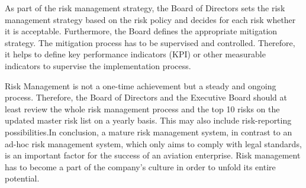 \documentclass[a4paper, 10pt]{article}
\begin{document}
As part of the risk management strategy, the Board of Directors sets the risk management
strategy based on the risk policy and decides for each risk whether it is acceptable. Furthermore,
the Board defines the appropriate mitigation strategy. The mitigation process has to be
supervised and controlled. Therefore, it helps to define key performance indicators (KPI) or
other measurable indicators to supervise the implementation process.\par

Risk Management is not a one-time achievement but a steady and ongoing process. Therefore,
the Board of Directors and the Executive Board should at least review the whole risk management
process and the top 10 risks on the updated master risk list on a yearly basis. This
may also include risk-reporting possibilities.In conclusion, a mature
risk management system, in contrast to an ad-hoc risk management system, which only aims
to comply with legal standards, is an important factor for the success of an aviation enterprise.
Risk management has to become a part of the company's culture in order to unfold its entire
potential.\par
\end{document}
